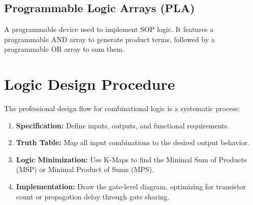 \subsection{Programmable Logic Arrays (PLA)}

\begin{definition}[PLA]
A programmable device used to implement SOP logic. It features a programmable AND array to generate product terms, followed by a programmable OR array to sum them.
\end{definition}

\section{Logic Design Procedure}

\begin{remark}
The professional design flow for combinational logic is a systematic process:

\begin{enumerate}
    \item \textbf{Specification:} Define inputs, outputs, and functional requirements.
    \item \textbf{Truth Table:} Map all input combinations to the desired output behavior.
    \item \textbf{Logic Minimization:} Use K-Maps to find the Minimal Sum of Products (MSP) or Minimal Product of Sums (MPS).
    \item \textbf{Implementation:} Draw the gate-level diagram, optimizing for transistor count or propagation delay through gate sharing.
\end{enumerate}

\end{remark}
